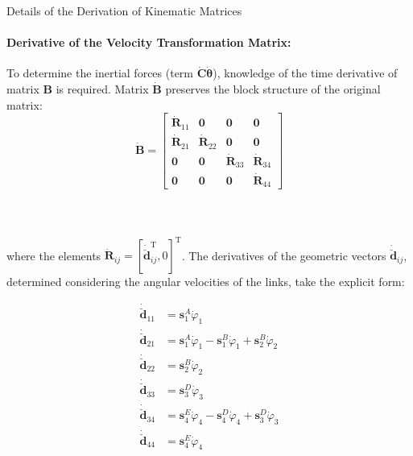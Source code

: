 \begin{easyappendix}{Details of the Derivation of Kinematic Matrices}
\paragraph{Derivative of the Velocity Transformation Matrix:}

To determine the inertial forces (term $\mathbf{\dot C}\boldsymbol{\dot \theta}$), knowledge of the time derivative of matrix $\mathbf{B}$ is required. Matrix $\mathbf{\dot B}$ preserves the block structure of the original matrix:
\begin{equation}
    \mathbf{\dot B} = \begin{bmatrix}
        \boldsymbol{\dot R}_{11} & \boldsymbol{0} &\boldsymbol{0} &\boldsymbol{0}\\
        \boldsymbol{\dot R}_{21} & \boldsymbol{\dot R}_{22} & \boldsymbol{0} & \boldsymbol{0}\\ 
        \boldsymbol{0} & \boldsymbol{0}&\boldsymbol{\dot R}_{33}&\boldsymbol{\dot R}_{34}\\
        \boldsymbol{0} & \boldsymbol{0} & \boldsymbol{0} & \boldsymbol{\dot R}_{44}
     \end{bmatrix}
\end{equation}
\\
\\
\\
where the elements $\boldsymbol{\dot R}_{ij} = [\boldsymbol{\dot{\breve d}}_{ij}^{\mathrm{T}}, 0]^\mathrm{T}$. The derivatives of the geometric vectors $\boldsymbol{\dot{\breve d}}_{ij}$, determined considering the angular velocities of the links, take the explicit form:

\begin{align}
    \boldsymbol{\dot{\breve{d}}}_{11} &= \boldsymbol{s}_1^A\dot \varphi_1 \nonumber \\
    \boldsymbol{\dot{\breve{d}}}_{21} &= \boldsymbol{s}_1^A \dot \varphi_1 - \boldsymbol{s}_1^B \dot \varphi_1 + \boldsymbol{s}_2^B \dot \varphi_2 \nonumber \\
    \boldsymbol{\dot{\breve d}}_{22} &= \boldsymbol{s}_2^B \dot \varphi_2 \label{eq:app_vectors_d_dot} \\
    \boldsymbol{\dot{\breve d}}_{33} &= \boldsymbol{s}_3^D \dot \varphi_3 \nonumber \\
    \boldsymbol{\dot{\breve d}}_{34} &= \boldsymbol{s}_4^E \dot \varphi_4 - \boldsymbol{s}_4^D\dot \varphi_4 + \boldsymbol{s}_3^D\dot \varphi_3 \nonumber \\
    \boldsymbol{\dot{\breve d}}_{44} &= \boldsymbol{s}_4^E\dot \varphi_4 \nonumber
\end{align}

\end{easyappendix}
